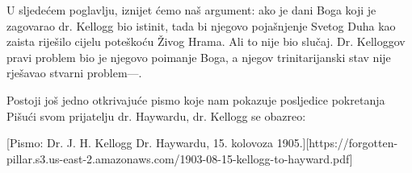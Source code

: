 U sljedećem poglavlju, iznijet ćemo naš argument: ako je dani  Boga koji je zagovarao dr. Kellogg bio istinit, tada bi njegovo pojašnjenje Svetog Duha kao  zaista riješilo cijelu poteškoću Živog Hrama. Ali to nije bio slučaj. Dr. Kelloggov pravi problem bio je njegovo poimanje Boga, a njegov trinitarijanski stav nije rješavao stvarni problem—.

Postoji još jedno otkrivajuće pismo koje nam pokazuje posljedice pokretanja  Pišući svom prijatelju dr. Haywardu, dr. Kellogg se obazreo:


[Pismo: Dr. J. H. Kellogg Dr. Haywardu, 15. kolovoza 1905.][https://forgotten-pillar.s3.us-east-2.amazonaws.com/1903-08-15-kellogg-to-hayward.pdf]

